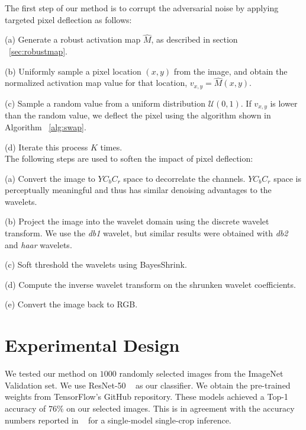 The first step of our method is to corrupt the adversarial noise by applying targeted pixel deflection as follows: %

(a) Generate a robust activation map $\widehat{M}$, as described in section ~\ref{sec:robustmap}.

(b) Uniformly sample a pixel location $(x,y)$ from the image, and obtain the normalized activation map value for that location, $v_{x,y} = \widehat{M}(x,y)$.

(c) Sample a random value from a uniform distribution $\mathcal{U}(0,1)$. If $v_{x,y}$ is lower than the random value, we deflect the pixel using the algorithm shown in Algorithm  ~\ref{alg:swap}. 

(d) Iterate this process $K$ times. \\

The following steps are used to soften the impact of pixel deflection:

(a) Convert the image to $YC_bC_r$ space to decorrelate the channels. $YC_bC_r$ space is perceptually meaningful and thus has similar denoising advantages to the wavelets.  

(b) Project the image into the wavelet domain using the discrete wavelet transform. We use the \textit{db1} wavelet, but similar results were obtained with \textit{db2} and \textit{haar} wavelets. 

(c) Soft threshold the wavelets using BayesShrink. 

(d) Compute the inverse wavelet transform on the shrunken wavelet coefficients.

(e) Convert the image back to RGB.

\section{Experimental Design\label{sec:exp}}

We tested our method on $1000$ randomly selected images from the ImageNet ~\cite{Deng2009ImageNetAL} Validation set. 
We use ResNet-50 ~\cite{He2016DeepRL} as our classifier. 
We obtain the pre-trained weights from TensorFlow's GitHub repository.
These models achieved a Top-1 accuracy of $76\%$ on our selected images. %
This is in agreement with the accuracy numbers reported in ~\cite{He2016DeepRL} for a single-model single-crop inference.

